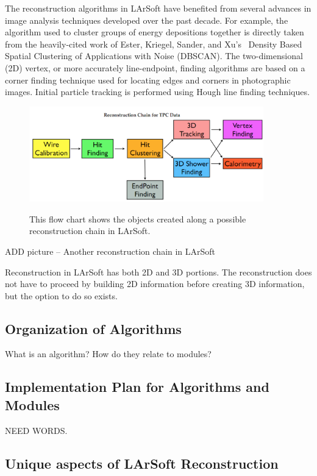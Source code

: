 \documentclass[12pt]{elsarticle}
\begin{document}
The reconstruction algorithms in LArSoft have benefited from several advances in image analysis techniques developed over the past decade.  For example, the algorithm used to cluster groups of energy depositions together is directly taken from the heavily-cited work of Ester, Kriegel, Sander, and Xu's~\cite{ester} Density Based Spatial Clustering of Applications with Noise (DBSCAN). The two-dimensional (2D) vertex, or more accurately line-endpoint, finding algorithms are based on a corner finding technique used for locating edges and corners in photographic images.  Initial particle tracking is performed using Hough line finding techniques.

\hspace*{2cm}
\begin{figure}[h]
\centering
\caption{This flow chart shows the objects created along a possible reconstruction chain in LArSoft.}
\includegraphics[width=4.0in]{./imgs/LArSoft-Recon-Flow-Soderberg.png}
\label{flow}
\end{figure}

ADD picture -- Another reconstruction chain in LArSoft

Reconstruction in LArSoft has both 2D and 3D portions. The reconstruction does not have to proceed by building 2D information before creating 3D information, but the option to do so exists. 

\subsection{Organization of Algorithms}

What is an algorithm? How do they relate to modules?

\subsection{Implementation Plan for Algorithms and Modules}
NEED WORDS.

\subsection{Unique aspects of LArSoft Reconstruction}
\end{document}
